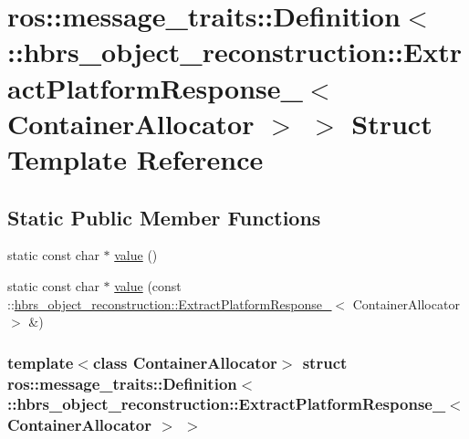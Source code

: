 \hypertarget{structros_1_1message__traits_1_1_definition_3_01_1_1hbrs__object__reconstruction_1_1_extract_pla358e696e78db188c71360b39ff1af787}{\section{ros\-:\-:message\-\_\-traits\-:\-:\-Definition$<$ \-:\-:hbrs\-\_\-object\-\_\-reconstruction\-:\-:\-Extract\-Platform\-Response\-\_\-$<$ \-Container\-Allocator $>$ $>$ \-Struct \-Template \-Reference}
\label{structros_1_1message__traits_1_1_definition_3_01_1_1hbrs__object__reconstruction_1_1_extract_pla358e696e78db188c71360b39ff1af787}
}
\subsection*{\-Static \-Public \-Member \-Functions}
\begin{DoxyCompactItemize}
\item 
static const char $\ast$ \hyperlink{structros_1_1message__traits_1_1_definition_3_01_1_1hbrs__object__reconstruction_1_1_extract_pla358e696e78db188c71360b39ff1af787_acb967bc5f62bde972e2864be7c01515b}{value} ()
\item 
static const char $\ast$ \hyperlink{structros_1_1message__traits_1_1_definition_3_01_1_1hbrs__object__reconstruction_1_1_extract_pla358e696e78db188c71360b39ff1af787_ab7fc0760794f4fcfb94eac4d61c1556b}{value} (const \-::\hyperlink{structhbrs__object__reconstruction_1_1_extract_platform_response__}{hbrs\-\_\-object\-\_\-reconstruction\-::\-Extract\-Platform\-Response\-\_\-}$<$ \-Container\-Allocator $>$ \&)
\end{DoxyCompactItemize}
\subsubsection*{template$<$class Container\-Allocator$>$ struct ros\-::message\-\_\-traits\-::\-Definition$<$ \-::hbrs\-\_\-object\-\_\-reconstruction\-::\-Extract\-Platform\-Response\-\_\-$<$ Container\-Allocator $>$ $>$}




